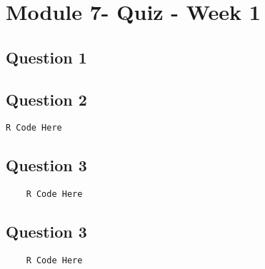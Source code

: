 \documentclass[french]{article}
\begin{document}
\section*{Module 7- Quiz - Week 1}
\subsection*{Question 1}

\newpage
\subsection*{Question 2}

\begin{framed}
\begin{verbatim}
R Code Here
\end{verbatim}
\end{framed}
\newpage
\subsection*{Question 3}
\begin{framed}
	\begin{verbatim}
	R Code Here
	\end{verbatim}
\end{framed}
\newpage
\subsection*{Question 3}
\begin{framed}
	\begin{verbatim}
	R Code Here
	\end{verbatim}
\end{framed}
\end{document}
